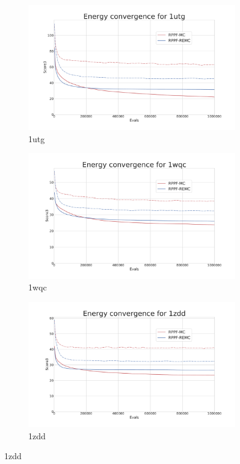 \begin{figure}[ht]\ContinuedFloat
  \begin{subfigure}{0.7\linewidth}
    \centering
    \includegraphics[width=1\linewidth]{Figuras/plots/energy_convergence/energy_convergence_1utg.pdf}
    \caption{1utg}
  \end{subfigure}
%
  \begin{subfigure}{0.7\linewidth}
    \centering
    \includegraphics[width=1\linewidth]{Figuras/plots/energy_convergence/energy_convergence_1wqc.pdf}
    \caption{1wqc}
  \end{subfigure}
%
  \begin{subfigure}{0.7\linewidth}
    \centering
    \includegraphics[width=1\linewidth]{Figuras/plots/energy_convergence/energy_convergence_1zdd.pdf}
    \caption{1zdd}
  \end{subfigure}
\end{figure}

